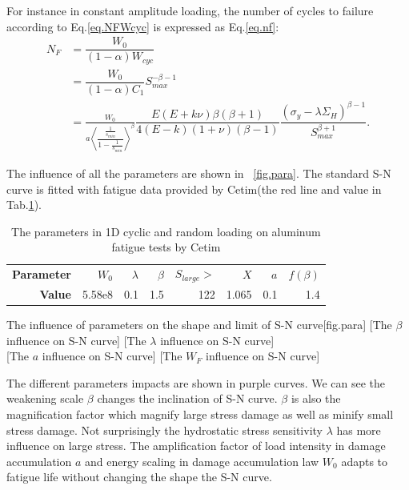 \documentclass[3p,times,number,review]{elsarticle}
\newcommand{\figref}[1]{\figurename~\ref{#1}}
\begin{document}
For instance in constant amplitude loading, the number of cycles to failure according to Eq.\eqref{eq.NFWcyc} is expressed as Eq.\eqref{eq.nf}:
\begin{equation}
\begin{split}
N_F&=\dfrac{W_0}{\left( 1-\alpha\right)W_{cyc} }
\\&=\dfrac{W_0}{\left( 1-\alpha\right)C_1}S_{max}^{-\beta-1}
\\&= \frac{W_0}{a\left\langle \dfrac{\frac{1}{s_{min}}}{1-\frac{1}{s_{min}}} \right\rangle^\beta}\dfrac{E(E+k\nu)\beta\left( \beta+1\right) }{ 4(E-k)(1+\nu)\left( \beta-1\right) }\dfrac{\left(\sigma_y-\lambda \Sigma_H\right)^{\beta-1}}{S_{max}^{\beta+1} }  .
\end{split}
\label{eq.nf}
\end{equation}


The influence of all the parameters are shown in \figref{fig.para}. The standard S-N curve is fitted with fatigue data provided by Cetim(the red line and value in Tab.\ref{tab.cetim.para}).

\begin{table}[!h]
	\centering
	\begin{tabular}{rrrrrrrr}
		\hline
		\textbf{Parameter} & \textbf{$W_0$} & \textbf{$\lambda$} & \textbf{$\beta$} & \textbf{$S_{large}>$} & \textbf{$X$} & \textbf{$a$} & \textbf{$f(\beta)$} \\
		\textbf{Value}     & 5.58e8         & 0.1                & 1.5              & 122                  & 1.065        & 0.1          & 1.4                 \\ \hline
	\end{tabular}
	\caption{The parameters in 1D cyclic and random loading on aluminum fatigue tests by Cetim}
	\label{tab.cetim.para}
\end{table}

\begin{Figure}[!h]{The influence of parameters on the shape and limit of S-N curve}[fig.para]
	[The $\beta$ influence on S-N curve]
	[The $\lambda$ influence on S-N curve]
	\\
    [The $a$ influence on S-N curve]
	[The $W_F$ influence on S-N curve]
\end{Figure}

 The different parameters impacts are shown in purple curves. We can see the weakening scale $\beta$ changes the inclination of S-N curve. $\beta$ is also the magnification factor which magnify large stress damage as well as minify small stress damage.  Not surprisingly the hydrostatic stress sensitivity $\lambda$ has more influence on large stress. The amplification factor of load intensity in damage accumulation $a$ and  energy scaling in damage accumulation law $W_0$ adapts to fatigue life without changing the shape the S-N curve.
\end{document}
